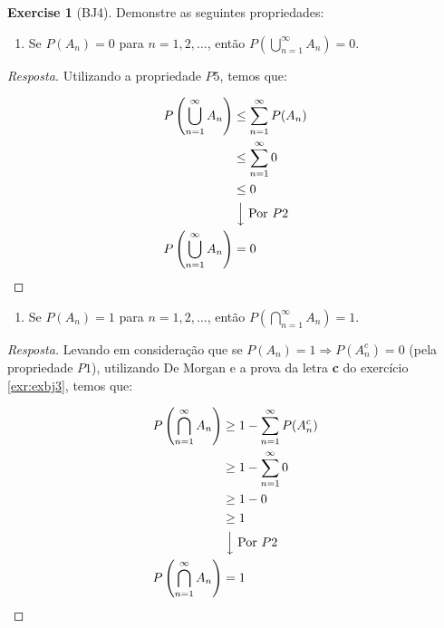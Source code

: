 \documentclass[
]{article}
\providecommand{\tightlist}{%
  \setlength{\itemsep}{0pt}\setlength{\parskip}{0pt}}
\theoremstyle{definition}
\theoremstyle{definition}
\theoremstyle{definition}
\newtheorem{exercise}{Exercise}[section]
\theoremstyle{definition}
\theoremstyle{remark}
\begin{document}
\begin{exercise}[BJ4]

Demonstre as seguintes propriedades:

\begin{enumerate}
\def\labelenumi{\alph{enumi})}
\tightlist
\item
  Se \(P(A_{n}) = 0\) para \(n = 1,2,\dots\), então \(P\left(\bigcup_{n=1}^{\infty}A_{n}\right) = 0\).
\end{enumerate}

\begin{proof}[Resposta]
Utilizando a propriedade \(P5\), temos que:

\begin{align*}
P\left(\bigcup_{n=1}^{\infty} A_{n}\right) &\le \sum_{n=1}^{\infty}P(A_{n}) \\
&\le \sum_{n=1}^{\infty}0 \\
&\le 0 \\
&\;\Big\downarrow \;\text{Por } P2\\
P\left(\bigcup_{n=1}^{\infty} A_{n}\right) &= 0
\end{align*}
\end{proof}

\begin{enumerate}
\def\labelenumi{\alph{enumi})}
\setcounter{enumi}{1}
\tightlist
\item
  Se \(P(A_{n}) = 1\) para \(n = 1,2,\dots\), então \(P\left(\bigcap_{n=1}^{\infty}A_{n}\right) = 1\).
\end{enumerate}

\begin{proof}[Resposta]
Levando em consideração que se \(P(A_{n}) = 1 \Rightarrow P(A_{n}^{c}) = 0\) (pela propriedade \(P1\)), utilizando De Morgan e a prova da letra \textbf{c} do exercício \ref{exr:exbj3}, temos que:

\begin{align*}
P\left(\bigcap_{n=1}^{\infty}A_{n}\right) &\ge 1 - \sum_{n=1}^{\infty} P(A_{n}^{c}) \\
&\ge 1 - \sum_{n=1}^{\infty}0 \\
&\ge 1 - 0 \\
&\ge 1 \\
&\;\Big\downarrow \;\text{Por } P2\\
P\left(\bigcap_{n=1}^{\infty}A_{n}\right) &= 1
\end{align*}
\end{proof}

\end{exercise}
\end{document}
